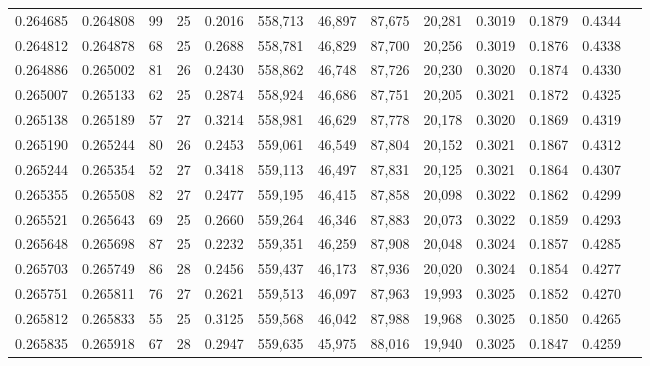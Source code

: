 \begin{tabular}{rrrrrrrrrrrrr}
0.264685 & 0.264808 &  99 &  25 &                                     0.2016 & 558,713 &  46,897 &  87,675 &  20,281 & 0.3019 & 0.1879 & 0.4344 \\
0.264812 & 0.264878 &  68 &  25 &                                     0.2688 & 558,781 &  46,829 &  87,700 &  20,256 & 0.3019 & 0.1876 & 0.4338 \\
0.264886 & 0.265002 &  81 &  26 &                                     0.2430 & 558,862 &  46,748 &  87,726 &  20,230 & 0.3020 & 0.1874 & 0.4330 \\
0.265007 & 0.265133 &  62 &  25 &                                     0.2874 & 558,924 &  46,686 &  87,751 &  20,205 & 0.3021 & 0.1872 & 0.4325 \\
0.265138 & 0.265189 &  57 &  27 &                                     0.3214 & 558,981 &  46,629 &  87,778 &  20,178 & 0.3020 & 0.1869 & 0.4319 \\
0.265190 & 0.265244 &  80 &  26 &                                     0.2453 & 559,061 &  46,549 &  87,804 &  20,152 & 0.3021 & 0.1867 & 0.4312 \\
0.265244 & 0.265354 &  52 &  27 &                                     0.3418 & 559,113 &  46,497 &  87,831 &  20,125 & 0.3021 & 0.1864 & 0.4307 \\
0.265355 & 0.265508 &  82 &  27 &                                     0.2477 & 559,195 &  46,415 &  87,858 &  20,098 & 0.3022 & 0.1862 & 0.4299 \\
0.265521 & 0.265643 &  69 &  25 &                                     0.2660 & 559,264 &  46,346 &  87,883 &  20,073 & 0.3022 & 0.1859 & 0.4293 \\
0.265648 & 0.265698 &  87 &  25 &                                     0.2232 & 559,351 &  46,259 &  87,908 &  20,048 & 0.3024 & 0.1857 & 0.4285 \\
0.265703 & 0.265749 &  86 &  28 &                                     0.2456 & 559,437 &  46,173 &  87,936 &  20,020 & 0.3024 & 0.1854 & 0.4277 \\
0.265751 & 0.265811 &  76 &  27 &                                     0.2621 & 559,513 &  46,097 &  87,963 &  19,993 & 0.3025 & 0.1852 & 0.4270 \\
0.265812 & 0.265833 &  55 &  25 &                                     0.3125 & 559,568 &  46,042 &  87,988 &  19,968 & 0.3025 & 0.1850 & 0.4265 \\
0.265835 & 0.265918 &  67 &  28 &                                     0.2947 & 559,635 &  45,975 &  88,016 &  19,940 & 0.3025 & 0.1847 & 0.4259 \\

\end{tabular}
